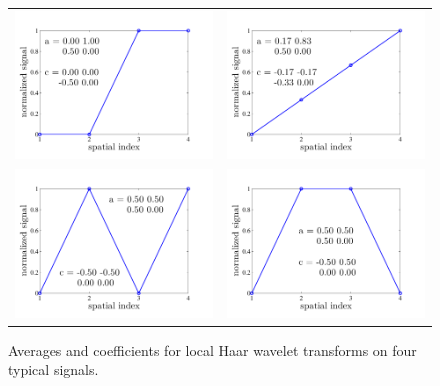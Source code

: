 \documentclass[11pt]{book}
\begin{document}
\begin{figure}[ht]
\centering
\begin{tabular}{rl}
\includegraphics[width=3.2in]{FIGURES/haar_step} &
\includegraphics[width=3.2in]{FIGURES/haar_line} \\
\includegraphics[width=3.2in]{FIGURES/haar_eddy} &
\includegraphics[width=3.2in]{FIGURES/haar_extr}
\end{tabular}
\vskip-0.2cm
\caption[Haar wavelet transforms on four typical signals]{Averages and coefficients for local Haar wavelet transforms on four typical signals.}
\label{fig_wavelet_transforms}
\end{figure}
\end{document}
